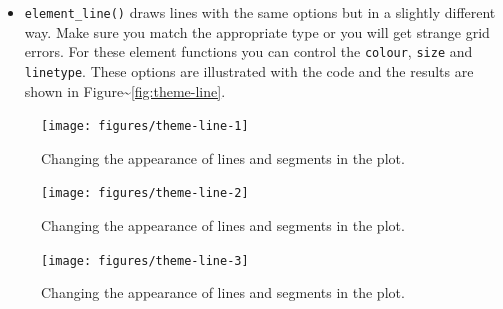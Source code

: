 \begin{itemize}
\itemsep1pt\parskip0pt
\item
  \texttt{element\_line()} draws lines with the same options but in a
  slightly different way. Make sure you match the appropriate type or
  you will get strange grid errors. For these element functions you can
  control the \texttt{colour}, \texttt{size} and \texttt{linetype}.
  These options are illustrated with the code and the results are shown
  in Figure\textasciitilde{}\ref{fig:theme-line}. 
\end{itemize}

\begin{Shaded}
\begin{Highlighting}[]
\StringTok{ }\NormalTok{(} \NormalTok{(} \NormalTok{))}
\end{Highlighting}
\end{Shaded}

\begin{figure}
\texttt{[image: figures/theme-line-1]} \caption{Changing the appearance of lines and segments in the plot.\label{fig:theme-line1}}
\end{figure}

\begin{Shaded}
\begin{Highlighting}[]
\StringTok{ }\NormalTok{(} \NormalTok{(} \NormalTok{))}
\end{Highlighting}
\end{Shaded}

\begin{figure}
\texttt{[image: figures/theme-line-2]} \caption{Changing the appearance of lines and segments in the plot.\label{fig:theme-line2}}
\end{figure}

\begin{Shaded}
\begin{Highlighting}[]
\StringTok{ }\NormalTok{(} \NormalTok{(} \NormalTok{))}
\end{Highlighting}
\end{Shaded}

\begin{figure}
\texttt{[image: figures/theme-line-3]} \caption{Changing the appearance of lines and segments in the plot.\label{fig:theme-line3}}
\end{figure}

